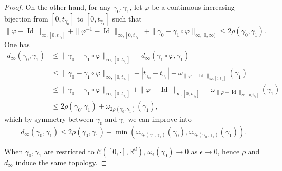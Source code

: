 \documentclass[11pt]{article}
\begin{document}
\begin{proof}
  On the other hand, for any $\gamma_0,\gamma_1$, let  $\varphi$ be a continuous increasing bijection from $[0,t_{\gamma_0}]$  to $[0,t_{\gamma_1}]$   such that
  \[
   \|\varphi-\operatorname{Id}\|_{\infty,[0,t_{\gamma_0}] }+\|\varphi^{-1}-\operatorname{Id}\|_{\infty,[0,t_{\gamma_1}] }+\|{\gamma}_0-{\gamma}_1\circ \varphi\|_{\infty,[0,\infty)} \leq 2
   \rho (\gamma_0, \gamma_1).
  \]
  One has
  \begin{align*} d_\infty(\gamma_0,\gamma_1)
  &\leq   \|\gamma_0-\gamma_1\circ \varphi\|_{\infty,[0,t_{\gamma_0}]} +d_\infty(\gamma_1\circ\varphi,\gamma_1 ) \\
  &\leq  \|\gamma_0-\gamma_1\circ \varphi\|_{\infty,[0,t_{\gamma_0}]} + |t_{\gamma_0}-t_{\gamma_1}| + \omega_{\|\varphi-\operatorname{Id}\|_{\infty,[0,t_{\gamma_0}]} }(\gamma_1)  \\
  &\leq  \|\gamma_0-\gamma_1\circ \varphi\|_{\infty,[0,t_{\gamma_0}]} + \|\varphi -\operatorname{Id}\|_{\infty,[0,t_{\gamma_0}]} + \omega_{\|\varphi-\operatorname{Id}\|_{\infty,[0,t_{\gamma_0}]} }(\gamma_1) \\
  &\leq 2\rho (\gamma_0, \gamma_1) +\omega_{2 \rho (\gamma_0, \gamma_1)}(\gamma_1),
  \end{align*}
which by symmetry between $\gamma_0$ and $\gamma_1$ we can improve into \[d_\infty(\gamma_0,\gamma_1)\leq 2\rho (\gamma_0, \gamma_1) +\min(\omega_{2 \rho (\gamma_0, \gamma_1)}(\gamma_0),\omega_{2 \rho (\gamma_0, \gamma_1)}(\gamma_1)).\]

  When $\gamma_0,\gamma_1$ are restricted to $\mathcal{C}([0,\cdot],\mathbb{R}^d)$, $\omega_\epsilon(\gamma_0)\to 0$ as $\epsilon\to 0$, hence $\rho$ and $d_\infty$ induce the same topology.
\end{proof}
\end{document}
